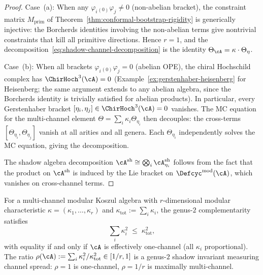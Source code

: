 \begin{proof}
Case~(a): When any $\varphi_i{}_{(0)}\varphi_j \neq 0$ (non-abelian
bracket), the constraint matrix $M_{\mathrm{prim}}$ of
Theorem~\ref{thm:conformal-bootstrap-rigidity} is generically
injective: the Borcherds identities involving the non-abelian terms
give nontrivial constraints that kill all primitive directions.  Hence
$r = 1$, and the decomposition~\eqref{eq:shadow-channel-decomposition}
is the identity $\Theta_\cA = \kappa \cdot \Theta_\eta$.

\smallskip
Case~(b): When all brackets $\varphi_i{}_{(0)}\varphi_j = 0$
(abelian OPE), the chiral Hochschild complex has
$\ChirHoch^3(\cA) = 0$
(Example~\ref{ex:gerstenhaber-heisenberg} for Heisenberg; the same
argument extends to any abelian algebra, since the Borcherds identity
is trivially satisfied for abelian products).  In particular, every
Gerstenhaber bracket $[\eta_i, \eta_j] \in \ChirHoch^3(\cA) = 0$
vanishes.  The MC equation for the multi-channel element
$\Theta = \sum_i \kappa_i \Theta_{\eta_i}$ then decouples:
the cross-terms $[\Theta_{\eta_i}, \Theta_{\eta_j}]$ vanish at all
arities and all genera.  Each $\Theta_{\eta_i}$ independently solves
the MC equation, giving the decomposition.

The shadow algebra decomposition
$\cA^{\mathrm{sh}} \cong \bigotimes_i \cA^{\mathrm{sh}}_{\eta_i}$
follows from the fact that the product on $\cA^{\mathrm{sh}}$
is induced by the Lie bracket on $\Defcyc^{\mathrm{mod}}(\cA)$,
which vanishes on cross-channel terms.
\end{proof}

\begin{corollary}
\label{cor:shadow-cauchy-schwarz}
For a multi-channel modular Koszul algebra with
$r$-dimensional modular characteristic
$\kappa = (\kappa_1, \ldots, \kappa_r)$ and
$\kappa_{\mathrm{tot}} := \sum_i \kappa_i$, the genus-$2$
complementarity satisfies
\begin{equation}\label{eq:shadow-cs}
\sum_i \kappa_i^2 \;\leq\; \kappa_{\mathrm{tot}}^2,
\end{equation}
with equality if and only if\/ $\cA$ is effectively one-channel
\textup{(}all $\kappa_i$ proportional\textup{)}.  The ratio
$\rho(\cA) := \sum_i \kappa_i^2 / \kappa_{\mathrm{tot}}^2
\in [1/r, 1]$
is a genus-$2$ shadow invariant measuring channel spread: $\rho = 1$
is one-channel, $\rho = 1/r$ is maximally multi-channel.
\end{corollary}

